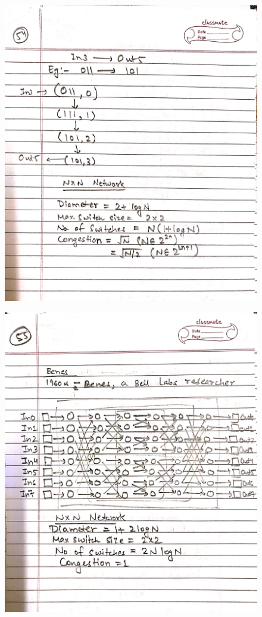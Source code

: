 \begin{figure}[H]
    \centering
    \includegraphics[scale=0.25]{"./MIT-6.042J/MIT-6042J-054"}
\end{figure}
\newpage
\begin{figure}[H]
    \centering
    \includegraphics[scale=0.25]{"./MIT-6.042J/MIT-6042J-055"}
\end{figure}
